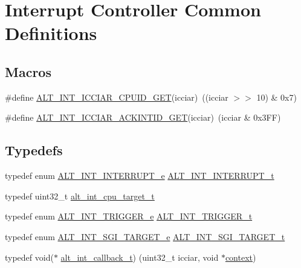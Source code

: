 \hypertarget{group__INT__COMMON}{}\section{Interrupt Controller Common Definitions}
\label{group__INT__COMMON}
\subsection*{Macros}
\begin{DoxyCompactItemize}
\item 
\#define \mbox{\hyperlink{group__INT__COMMON_ga0b64308d6e2a4f21f7915b6baf6eded9}{A\+L\+T\+\_\+\+I\+N\+T\+\_\+\+I\+C\+C\+I\+A\+R\+\_\+\+C\+P\+U\+I\+D\+\_\+\+G\+ET}}(icciar)~((icciar $>$$>$ 10) \& 0x7)
\item 
\#define \mbox{\hyperlink{group__INT__COMMON_ga90923330529a22d1e076b22ef53d84f1}{A\+L\+T\+\_\+\+I\+N\+T\+\_\+\+I\+C\+C\+I\+A\+R\+\_\+\+A\+C\+K\+I\+N\+T\+I\+D\+\_\+\+G\+ET}}(icciar)~(icciar \& 0x3\+F\+F)
\end{DoxyCompactItemize}
\subsection*{Typedefs}
\begin{DoxyCompactItemize}
\item 
typedef enum \mbox{\hyperlink{group__INT__COMMON_gaf87a5a7f416fc6f679b59dadacbeb592}{A\+L\+T\+\_\+\+I\+N\+T\+\_\+\+I\+N\+T\+E\+R\+R\+U\+P\+T\+\_\+e}} \mbox{\hyperlink{group__INT__COMMON_ga394d3efae4a3ee1015ed47f9698deea6}{A\+L\+T\+\_\+\+I\+N\+T\+\_\+\+I\+N\+T\+E\+R\+R\+U\+P\+T\+\_\+t}}
\item 
typedef uint32\+\_\+t \mbox{\hyperlink{group__INT__COMMON_ga0986f657275460bf46c91f02b77c8667}{alt\+\_\+int\+\_\+cpu\+\_\+target\+\_\+t}}
\item 
typedef enum \mbox{\hyperlink{group__INT__COMMON_ga30a2ad1b5e644feb2f502ab3fb39756e}{A\+L\+T\+\_\+\+I\+N\+T\+\_\+\+T\+R\+I\+G\+G\+E\+R\+\_\+e}} \mbox{\hyperlink{group__INT__COMMON_ga69d4792f881cdf473ca64f8b4e23ba52}{A\+L\+T\+\_\+\+I\+N\+T\+\_\+\+T\+R\+I\+G\+G\+E\+R\+\_\+t}}
\item 
typedef enum \mbox{\hyperlink{group__INT__COMMON_ga746ce27835235f2cd0199b089482b770}{A\+L\+T\+\_\+\+I\+N\+T\+\_\+\+S\+G\+I\+\_\+\+T\+A\+R\+G\+E\+T\+\_\+e}} \mbox{\hyperlink{group__INT__COMMON_ga7e81bbf0aa421b2c5ec85a6bfe42c051}{A\+L\+T\+\_\+\+I\+N\+T\+\_\+\+S\+G\+I\+\_\+\+T\+A\+R\+G\+E\+T\+\_\+t}}
\item 
typedef void($\ast$ \mbox{\hyperlink{group__INT__COMMON_gace129e79f7e2eee4b0cfc7a0cc297053}{alt\+\_\+int\+\_\+callback\+\_\+t}}) (uint32\+\_\+t icciar, void $\ast$\mbox{\hyperlink{sun4u_2tte_8h_a9b4a99475e2709333b8e5d70483173f1}{context}})
\end{DoxyCompactItemize}
